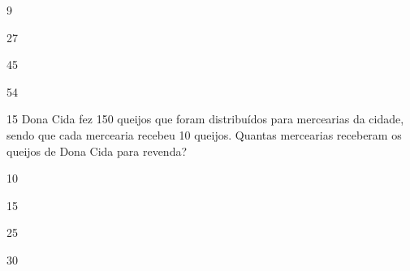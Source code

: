 \begin{escolha}
\item 9

\item 27

\item 45

\item 54
\end{escolha}

\num{15} Dona Cida fez 150 queijos que foram distribuídos para mercearias da cidade, sendo que cada mercearia recebeu 10 queijos. Quantas mercearias receberam os queijos de Dona
Cida para revenda?

\begin{escolha}
\item 10

\item 15

\item 25

\item 30
\end{escolha}


